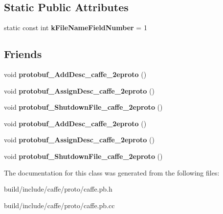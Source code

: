 \subsection*{Static Public Attributes}
\begin{DoxyCompactItemize}
\item 
\mbox{\label{classcaffe_1_1_h_d_f5_output_parameter_aaad2f308674474c9412de78a3cb4d88a}} 
static const int {\bfseries k\+File\+Name\+Field\+Number} = 1
\end{DoxyCompactItemize}
\subsection*{Friends}
\begin{DoxyCompactItemize}
\item 
\mbox{\label{classcaffe_1_1_h_d_f5_output_parameter_a2670a9c8ffd0e5105cf7522cd6f8613d}} 
void {\bfseries protobuf\+\_\+\+Add\+Desc\+\_\+caffe\+\_\+2eproto} ()
\item 
\mbox{\label{classcaffe_1_1_h_d_f5_output_parameter_a7f145bddbdde78003d27e42c7e003d23}} 
void {\bfseries protobuf\+\_\+\+Assign\+Desc\+\_\+caffe\+\_\+2eproto} ()
\item 
\mbox{\label{classcaffe_1_1_h_d_f5_output_parameter_a026784a8e4e76f1b4daf9d033d2ece83}} 
void {\bfseries protobuf\+\_\+\+Shutdown\+File\+\_\+caffe\+\_\+2eproto} ()
\item 
\mbox{\label{classcaffe_1_1_h_d_f5_output_parameter_a2670a9c8ffd0e5105cf7522cd6f8613d}} 
void {\bfseries protobuf\+\_\+\+Add\+Desc\+\_\+caffe\+\_\+2eproto} ()
\item 
\mbox{\label{classcaffe_1_1_h_d_f5_output_parameter_a7f145bddbdde78003d27e42c7e003d23}} 
void {\bfseries protobuf\+\_\+\+Assign\+Desc\+\_\+caffe\+\_\+2eproto} ()
\item 
\mbox{\label{classcaffe_1_1_h_d_f5_output_parameter_a026784a8e4e76f1b4daf9d033d2ece83}} 
void {\bfseries protobuf\+\_\+\+Shutdown\+File\+\_\+caffe\+\_\+2eproto} ()
\end{DoxyCompactItemize}


The documentation for this class was generated from the following files\+:\begin{DoxyCompactItemize}
\item 
build/include/caffe/proto/caffe.\+pb.\+h\item 
build/include/caffe/proto/caffe.\+pb.\+cc\end{DoxyCompactItemize}
